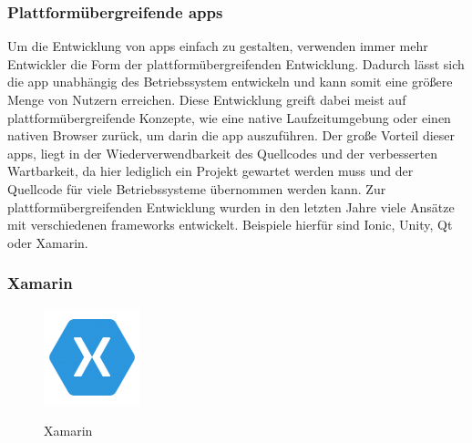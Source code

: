 \subsubsection{Plattformübergreifende \glspl{app}}

Um die Entwicklung von \glspl{app} einfach zu gestalten, verwenden immer mehr Entwickler die Form der plattformübergreifenden Entwicklung. Dadurch lässt sich die \gls{app} unabhängig des Betriebssystem entwickeln und kann somit eine größere Menge von Nutzern erreichen. Diese Entwicklung greift dabei meist auf plattformübergreifende Konzepte, wie eine native Laufzeitumgebung oder einen nativen Browser zurück, um darin die \gls{app} auszuführen. Der große Vorteil dieser \glspl{app}, liegt in der Wiederverwendbarkeit des Quellcodes und der verbesserten Wartbarkeit, da hier lediglich ein Projekt gewartet werden muss und der Quellcode für viele Betriebssysteme übernommen werden kann. Zur plattformübergreifenden Entwicklung wurden in den letzten Jahre viele Ansätze mit verschiedenen \glspl{framework} entwickelt. Beispiele hierfür sind Ionic, Unity, Qt oder Xamarin.\\
\newpage

\subsubsection{Xamarin}

\begin{figure}
	\begin{center}
		\includegraphics[width=0.25\textwidth]{images/technische_grundlagen/xamarin.png}
	\end{center}
	\caption{Xamarin}
	\cite{Xamarin}
	\label{fig:xamarin}
\end{figure}

